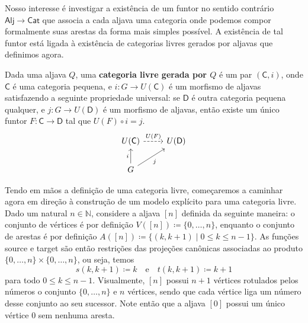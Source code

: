 Nosso interesse é investigar a existência de um funtor no sentido contrário $\mathsf{Alj} \to \mathsf{Cat}$ que associa a cada aljava uma categoria onde podemos compor formalmente suas arestas da forma mais simples possível.
A existência de tal funtor está ligada à existência de categorias livres gerados por aljavas que definimos agora.

\begin{defin}\label{defin:categoria_livre}
    Dada uma aljava $Q$, uma \textbf{categoria livre gerada por $Q$} é um par $(\mathsf{C},i)$, onde $\mathsf{C}$ é uma categoria pequena, e $i: G \to U(\mathsf{C})$ é um morfismo de aljavas satisfazendo a seguinte propriedade universal: se $\mathsf{D}$ é outra categoria pequena qualquer, e $j: G \to U(\mathsf{D})$ é um morfismo de aljavas, então existe um único funtor $F: \mathsf{C} \to \mathsf{D}$ tal que $U(F) \circ i = j$.
    \begin{displaymath}
        \begin{tikzcd}
            U(\mathsf{C})
            \arrow[r, dashed, "U(F)"]
            & U(\mathsf{D})
            \\ G
            \arrow[u, "i"]
            \arrow[ru, "j" swap]
        \end{tikzcd}
    \end{displaymath}
\end{defin}

Tendo em mãos a definição de uma categoria livre, começaremos a caminhar agora em direção à construção de um modelo explícito para uma categoria livre.
Dado um natural $n \in \mathbb{N}$, considere a aljava $[n]$ definida da seguinte maneira: o conjunto de vértices é por definição $V([n]) \coloneqq \{0,\dots,n\}$, enquanto o conjunto de arestas é por definição $A([n]) \coloneqq \{(k,k+1) \mid 0 \leq k \leq n-1\}$.
As funções source e target são então restrições das projeções canônicas associadas ao produto $\{0,\dots,n\} \times \{0,\dots,n\}$, ou seja, temos
\begin{displaymath}
    s(k,k+1) \coloneqq k
    \quad \text{e} \quad
    t(k,k+1) \coloneqq k+1
\end{displaymath}
para todo $0 \leq k \leq n-1$.
Visualmente, $[n]$ possui $n+1$ vértices rotulados pelos números o conjunto $\{0,\dots,n\}$ e $n$ vértices, sendo que cada vértice liga um número desse conjunto ao seu sucessor.
Note então que a aljava $[0]$ possui um único vértice $0$ sem nenhuma aresta.


